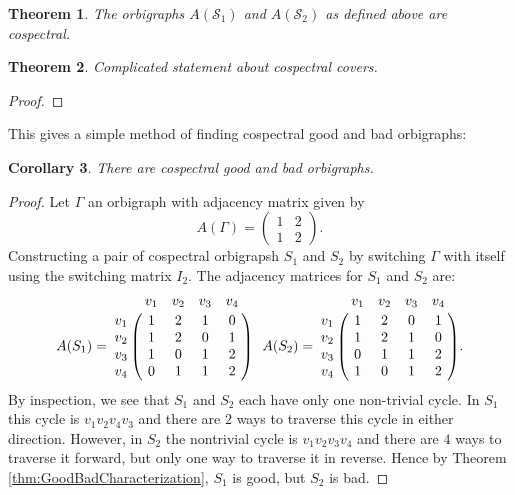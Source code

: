 \documentclass[12pt]{article}
\theoremstyle{plain}
\newtheorem{theorem}{Theorem}
\newtheorem{corollary}[theorem]{Corollary}
\theoremstyle{definition}
\theoremstyle{remark}
\begin{document}
  \begin{theorem}\label{thm:SeidelSwitchingSimple}
  The orbigraphs $A(\mathcal{S}_1)$ and $A(\mathcal{S}_2)$ as defined above are cospectral.
  \end{theorem}

  

  \begin{theorem}\label{thm:SeidelSwitchingExtension}
    Complicated statement about cospectral covers.
  \end{theorem}
  \begin{proof}
  \end{proof}

  This gives a simple method of finding cospectral good and bad orbigraphs:

  \begin{corollary}\label{coro:GoodBadCospectral}
    There are cospectral good and bad orbigraphs.
  \end{corollary}
  \begin{proof}
    Let $\Gamma$ an orbigraph with adjacency matrix given by
    $$
    A(\Gamma) = 
      \left( \begin{array}{cc}
        1 & 2 \\
        1 & 2
      \end{array} \right).
    $$
    Constructing a pair of cospectral orbigrapsh $S_1$ and $S_2$ by switching $\Gamma$ with itself using the switching matrix $I_2$. The adjacency matrices for $S_1$ and $S_2$ are:
    $$
    A(S_1) = 
      \bordermatrix {
            & v_1 & v_2 & v_3 & v_4 \cr
        v_1 & 1   & 2   & 1   & 0   \cr
        v_2 & 1   & 2   & 0   & 1   \cr
        v_3 & 1   & 0   & 1   & 2   \cr
        v_4 & 0   & 1   & 1   & 2
      } \ \ 
    A(S_2) = 
      \bordermatrix {
            & v_1 & v_2 & v_3 & v_4 \cr
        v_1 & 1   & 2   & 0   & 1   \cr
        v_2 & 1   & 2   & 1   & 0   \cr
        v_3 & 0   & 1   & 1   & 2   \cr
        v_4 & 1   & 0   & 1   & 2
      }.
    $$
    By inspection, we see that $S_1$ and $S_2$ each have only one non-trivial cycle. In $S_1$ this cycle is $v_1 v_2 v_4 v_3$ and there are $2$ ways to traverse this cycle in either direction. However, in $S_2$ the nontrivial cycle is $v_1 v_2 v_3 v_4$ and there are $4$ ways to traverse it forward, but only one way to traverse it in reverse. Hence by Theorem \ref{thm:GoodBadCharacterization}, $S_1$ is good, but $S_2$ is bad.
  \end{proof}


\end{document}
